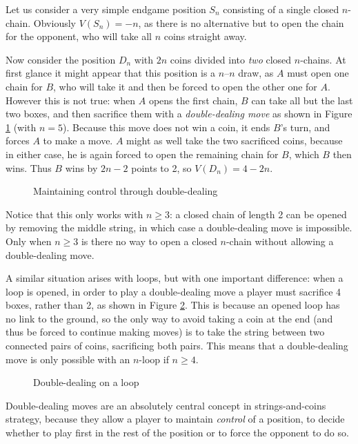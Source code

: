 \documentclass[a4paper,twocolumn]{article}
\begin{document}
Let us consider a very simple endgame position $S_n$ consisting of a
single closed $n$-chain. Obviously $V(S_n)=-n$, as there is no
alternative but to open the chain for the opponent, who will take all
$n$ coins straight away.

Now consider the position $D_n$ with $2n$ coins divided into
\emph{two} closed $n$-chains. At first glance it might appear that
this position is a $n$--$n$ draw, as $A$ must open one chain for $B$,
who will take it and then be forced to open the other one for
$A$. However this is not true: when $A$ opens the first chain, $B$ can
take all but the last two boxes, and then sacrifice them with a
\emph{double-dealing move} as shown in Figure \ref{dddemo} (with
$n=5$). Because this move does not win a coin, it ends $B$'s turn, and
forces $A$ to make a move. $A$ might as well take the two sacrificed
coins, because in either case, he is again forced to open the
remaining chain for $B$, which $B$ then wins. Thus $B$ wins by $2n -
2$ points to 2, so $V(D_n) = 4-2n$.

\begin{figure}
  \centering
  \def\svgscale{0.7}
  
  \caption{Maintaining control through double-dealing}
  \label{dddemo}
\end{figure}

Notice that this only works with $n \ge 3$: a closed chain of length 2
can be opened by removing the middle string, in which case a
double-dealing move is impossible. Only when $n \ge 3$ is there no way
to open a closed $n$-chain without allowing a double-dealing move.

A similar situation arises with loops, but with one important
difference: when a loop is opened, in order to play a double-dealing
move a player must sacrifice 4 boxes, rather than 2, as shown in
Figure \ref{loopdoubledeal}. This is because an opened loop has no
link to the ground, so the only way to avoid taking a coin at the end
(and thus be forced to continue making moves) is to take the string
between two connected pairs of coins, sacrificing both pairs. This
means that a double-dealing move is only possible with an $n$-loop if
$n \ge 4$.

\begin{figure}
  \centering
  \def\svgscale{0.7}
  
  \caption{Double-dealing on a loop}
  \label{loopdoubledeal}
\end{figure}

Double-dealing moves are an absolutely central concept in
strings-and-coins strategy, because they allow a player to maintain
\emph{control} of a position, to decide whether to play first in the
rest of the position or to force the opponent to do so.
\end{document}
